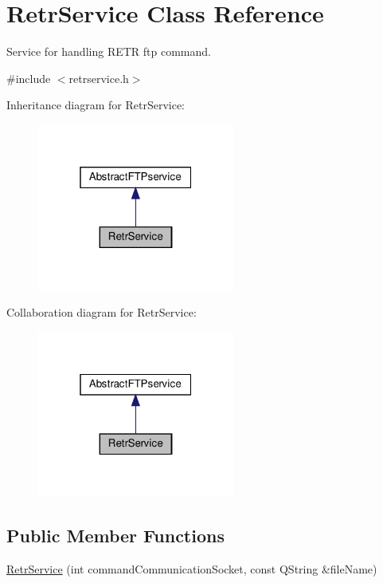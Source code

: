 \hypertarget{classRetrService}{}\section{Retr\+Service Class Reference}
\label{classRetrService}


Service for handling R\+E\+TR ftp command.  




{\ttfamily \#include $<$retrservice.\+h$>$}



Inheritance diagram for Retr\+Service\+:\nopagebreak
\begin{figure}[H]
\begin{center}
\leavevmode
\includegraphics[width=184pt]{d1/deb/classRetrService__inherit__graph}
\end{center}
\end{figure}


Collaboration diagram for Retr\+Service\+:\nopagebreak
\begin{figure}[H]
\begin{center}
\leavevmode
\includegraphics[width=184pt]{dc/d66/classRetrService__coll__graph}
\end{center}
\end{figure}
\subsection*{Public Member Functions}
\begin{DoxyCompactItemize}
\item 
\hyperlink{classRetrService_a9540dcf841b69e54405b8600aa75ca74}{Retr\+Service} (int command\+Communication\+Socket, const Q\+String \&file\+Name)
\end{DoxyCompactItemize}
